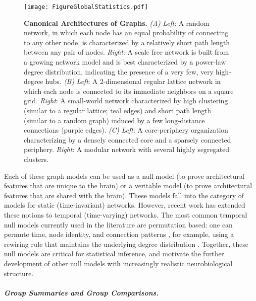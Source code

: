 \documentclass[12pt]{article}
\begin{document}
\begin{figure}[h!]
	\centerline{\texttt{[image: FigureGlobalStatistics.pdf]}}
	\caption{\textbf{Canonical Architectures of Graphs.} \emph{(A)} \emph{Left}: A random network, in which each node has an equal probability of connecting to any other node, is characterized by a relatively short path length between any pair of nodes. \emph{Right}: A scale free network is built from a growing network model and is best characterized by a power-law degree distribution, indicating the presence of a very few, very high-degree hubs. \emph{(B)} \emph{Left}: A 2-dimensional regular lattice network in which each node is connected to its immediate neighbors on a square grid. \emph{Right}: A small-world network characterized by high clustering (similar to a regular lattice; teal edges) and short path length (similar to a random graph) induced by a few long-distance connections (purple edges). \emph{(C)} \emph{Left}: A core-periphery organization characterizing by a densely connected core and a sparsely connected periphery. \emph{Right}: A modular network with several highly segregated clusters.}
	\label{fig:globalstatistics}
	\centering
\end{figure}


Each of these graph models can be used as a null model (to prove architectural features that are unique to the brain) or a veritable model (to prove architectural features that are shared with the brain). These models fall into the category of models for static (time-invariant) networks. However, recent work has extended these notions to temporal (time-varying) networks. The most common temporal null models currently used in the literature are permutation based: one can permute time, node identity, and connection patterns \cite{Bassett2011b,Bassett2012b,Doron2012,Bassett2013}, for example, using a rewiring rule that maintains the underlying degree distribution \cite{Maslov2002}. Together, these null models are critical for statistical inference, and motivate the further development of other null models with increasingly realistic neurobiological structure. 

\paragraph{\emph{Group Summaries and Group Comparisons.}}
\end{document}
